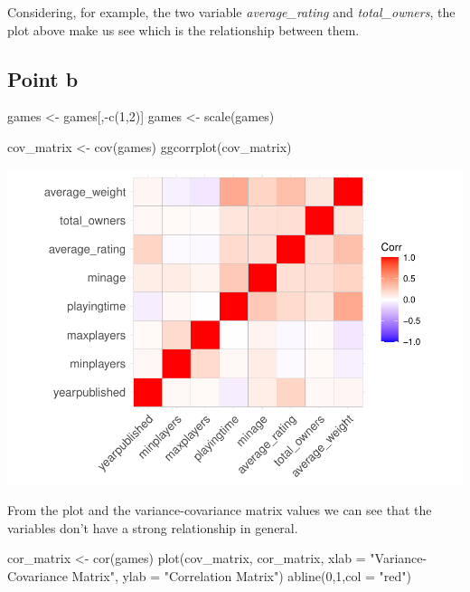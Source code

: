 \documentclass[
]{article}
\newenvironment{Shaded}{\begin{snugshade}}{\end{snugshade}}
\newcommand{\AttributeTok}[1]{\textcolor[rgb]{0.77,0.63,0.00}{#1}}
\newcommand{\DecValTok}[1]{\textcolor[rgb]{0.00,0.00,0.81}{#1}}
\newcommand{\FunctionTok}[1]{\textcolor[rgb]{0.00,0.00,0.00}{#1}}
\newcommand{\NormalTok}[1]{#1}
\newcommand{\OtherTok}[1]{\textcolor[rgb]{0.56,0.35,0.01}{#1}}
\newcommand{\SpecialCharTok}[1]{\textcolor[rgb]{0.00,0.00,0.00}{#1}}
\newcommand{\StringTok}[1]{\textcolor[rgb]{0.31,0.60,0.02}{#1}}
\begin{document}
Considering, for example, the two variable \emph{average\_rating} and
\emph{total\_owners}, the plot above make us see which is the
relationship between them.

\hypertarget{point-b}{%
\subsection{Point b}\label{point-b}}

\begin{Shaded}
\begin{Highlighting}[]
\NormalTok{games }\OtherTok{\textless{}{-}}\NormalTok{ games[,}\SpecialCharTok{{-}}\FunctionTok{c}\NormalTok{(}\DecValTok{1}\NormalTok{,}\DecValTok{2}\NormalTok{)]}
\NormalTok{games }\OtherTok{\textless{}{-}} \FunctionTok{scale}\NormalTok{(games)}
\end{Highlighting}
\end{Shaded}

\begin{Shaded}
\begin{Highlighting}[]
\NormalTok{cov\_matrix }\OtherTok{\textless{}{-}} \FunctionTok{cov}\NormalTok{(games)}
\FunctionTok{ggcorrplot}\NormalTok{(cov\_matrix)}
\end{Highlighting}
\end{Shaded}

\includegraphics{ANUASS2TEST_files/figure-latex/unnamed-chunk-5-1.pdf}

From the plot and the variance-covariance matrix values we can see that
the variables don't have a strong relationship in general.

\begin{Shaded}
\begin{Highlighting}[]
\NormalTok{cor\_matrix }\OtherTok{\textless{}{-}} \FunctionTok{cor}\NormalTok{(games)}
\FunctionTok{plot}\NormalTok{(cov\_matrix, cor\_matrix, }
     \AttributeTok{xlab =} \StringTok{"Variance{-}Covariance Matrix"}\NormalTok{,}
     \AttributeTok{ylab =} \StringTok{"Correlation Matrix"}\NormalTok{)}
\FunctionTok{abline}\NormalTok{(}\DecValTok{0}\NormalTok{,}\DecValTok{1}\NormalTok{,}\AttributeTok{col =} \StringTok{"red"}\NormalTok{)}
\end{Highlighting}
\end{Shaded}
\end{document}
